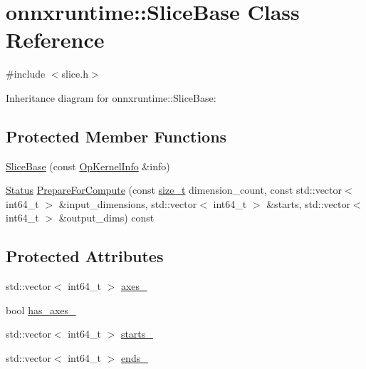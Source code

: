 \hypertarget{classonnxruntime_1_1SliceBase}{}\section{onnxruntime\+:\+:Slice\+Base Class Reference}
\label{classonnxruntime_1_1SliceBase}


{\ttfamily \#include $<$slice.\+h$>$}



Inheritance diagram for onnxruntime\+:\+:Slice\+Base\+:
\subsection*{Protected Member Functions}
\begin{DoxyCompactItemize}
\item 
\mbox{\hyperlink{classonnxruntime_1_1SliceBase_a11f5d17d420505aa93f1aed03aefa603}{Slice\+Base}} (const \mbox{\hyperlink{classonnxruntime_1_1OpKernelInfo}{Op\+Kernel\+Info}} \&info)
\item 
\mbox{\hyperlink{classonnxruntime_1_1common_1_1Status}{Status}} \mbox{\hyperlink{classonnxruntime_1_1SliceBase_af5027d33a64a37d4ff7eb2c599083e63}{Prepare\+For\+Compute}} (const \mbox{\hyperlink{mlasi_8h_a503efbc1c6e50825320ad909366b78ab}{size\+\_\+t}} dimension\+\_\+count, const std\+::vector$<$ int64\+\_\+t $>$ \&input\+\_\+dimensions, std\+::vector$<$ int64\+\_\+t $>$ \&starts, std\+::vector$<$ int64\+\_\+t $>$ \&output\+\_\+dims) const
\end{DoxyCompactItemize}
\subsection*{Protected Attributes}
\begin{DoxyCompactItemize}
\item 
std\+::vector$<$ int64\+\_\+t $>$ \mbox{\hyperlink{classonnxruntime_1_1SliceBase_afb18bd853e3c7bec3036b425f3c50601}{axes\+\_\+}}
\item 
bool \mbox{\hyperlink{classonnxruntime_1_1SliceBase_a5b5a59fb9e84bbfd3b3584e9f4a55827}{has\+\_\+axes\+\_\+}}
\item 
std\+::vector$<$ int64\+\_\+t $>$ \mbox{\hyperlink{classonnxruntime_1_1SliceBase_a7ee90fe3930425804793ea0f8298ee9c}{starts\+\_\+}}
\item 
std\+::vector$<$ int64\+\_\+t $>$ \mbox{\hyperlink{classonnxruntime_1_1SliceBase_aebafc23295c3f86ab955fd59664d9956}{ends\+\_\+}}
\end{DoxyCompactItemize}


